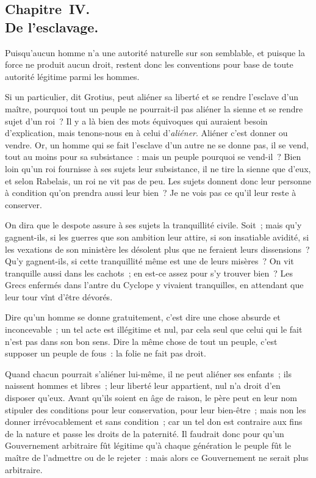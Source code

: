 \documentclass[french,twoside]{book} %
\begin{document}
\subsection[{Chapitre IV. De l’esclavage.}]{Chapitre IV. \\
De l’esclavage.}
\noindent Puisqu’aucun homme n’a une autorité naturelle sur son semblable, et puisque la force ne produit aucun droit, restent donc les conventions pour base de toute autorité légitime parmi les hommes.\par
Si un particulier, dit Grotius, peut aliéner sa liberté et se rendre l’esclave d’un maître, pourquoi tout un peuple ne pourrait-il pas aliéner la sienne et se rendre sujet d’un roi ? Il y a là bien des mots équivoques qui auraient besoin d’explication, mais tenons-nous en à celui d’{\itshape aliéner}. Aliéner c’est donner ou vendre. Or, un homme qui se fait l’esclave d’un autre ne se donne pas, il se vend, tout au moins pour sa subsistance : mais un peuple pourquoi se vend-il ? Bien loin qu’un roi fournisse à ses sujets leur subsistance, il ne tire la sienne que d’eux, et selon Rabelais, un roi ne vit pas de peu. Les sujets donnent donc leur personne à condition qu’on prendra aussi leur bien ? Je ne vois pas ce qu’il leur reste à conserver.\par
On dira que le despote assure à ses sujets la tranquillité civile. Soit ; mais qu’y gagnent-ils, si les guerres que son ambition leur attire, si son insatiable avidité, si les vexations de son ministère les désolent plus que ne feraient leurs dissensions ? Qu’y gagnent-ils, si cette tranquillité même est une de leurs misères ? On vit tranquille aussi dans les cachots ; en est-ce assez pour s’y trouver bien ? Les Grecs enfermés dans l’antre du Cyclope y vivaient tranquilles, en attendant que leur tour vînt d’être dévorés.\par
Dire qu’un homme se donne gratuitement, c’est dire une chose absurde et inconcevable ; un tel acte est illégitime et nul, par cela seul que celui qui le fait n’est pas dans son bon sens. Dire la même chose de tout un peuple, c’est supposer un peuple de fous : la folie ne fait pas droit.\par
Quand chacun pourrait s’aliéner lui-même, il ne peut aliéner ses enfants ; ils naissent hommes et libres ; leur liberté leur appartient, nul n’a droit d’en disposer qu’eux. Avant qu’ils soient en âge de raison, le père peut en leur nom stipuler des conditions pour leur conservation, pour leur bien-être ; mais non les donner irrévocablement et sans condition ; car un tel don est contraire aux fins de la nature et passe les droits de la paternité. Il faudrait donc pour qu’un Gouvernement arbitraire fût légitime qu’à chaque génération le peuple fût le maître de l’admettre ou de le rejeter : mais alors ce Gouvernement ne serait plus arbitraire.\par
\end{document}
